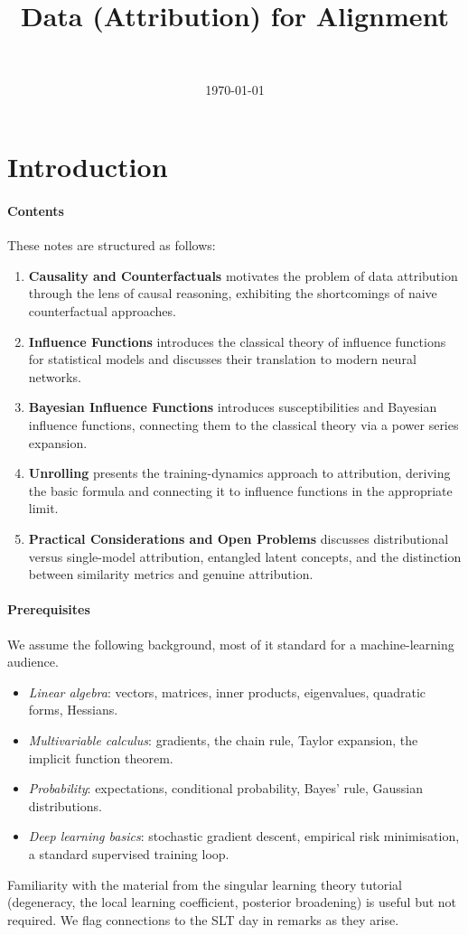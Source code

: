 \documentclass[11pt]{article}
\title{Data (Attribution) for Alignment}
\author{\authorname{Louis Jaburi}\\ \affiliation{EleutherAI}}
\date{\today}
\begin{document}
\maketitle
\tableofcontents
\section*{Introduction}


\paragraph{Contents} These notes are structured as follows:

\begin{enumerate}[label=\arabic*.]
  \item \textbf{Causality and Counterfactuals} motivates the problem of data attribution through the lens of causal reasoning, exhibiting the shortcomings of naive counterfactual approaches.
  \item \textbf{Influence Functions} introduces the classical theory of influence functions for statistical models and discusses their translation to modern neural networks.
  \item \textbf{Bayesian Influence Functions} introduces susceptibilities and Bayesian influence functions, connecting them to the classical theory via a power series expansion.
  \item \textbf{Unrolling} presents the training-dynamics approach to attribution, deriving the basic formula and connecting it to influence functions in the appropriate limit.
  \item \textbf{Practical Considerations and Open Problems} discusses distributional versus single-model attribution, entangled latent concepts, and the distinction between similarity metrics and genuine attribution.
\end{enumerate}

\paragraph{Prerequisites} We assume the following background, most of it standard for a machine-learning audience.
\begin{itemize}
  \item \emph{Linear algebra}: vectors, matrices, inner products, eigenvalues, quadratic forms, Hessians.
  \item \emph{Multivariable calculus}: gradients, the chain rule, Taylor expansion, the implicit function theorem.
  \item \emph{Probability}: expectations, conditional probability, Bayes' rule, Gaussian distributions.
  \item \emph{Deep learning basics}: stochastic gradient descent, empirical risk minimisation, a standard supervised training loop.
\end{itemize}
Familiarity with the material from the singular learning theory tutorial (degeneracy, the local learning coefficient, posterior broadening) is useful but not required. We flag connections to the SLT day in remarks as they arise.
\end{document}

